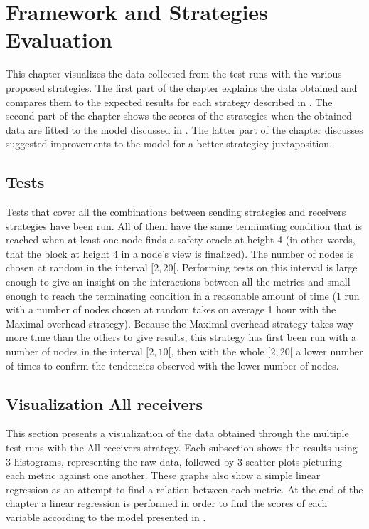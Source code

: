 \chapter{Framework and Strategies Evaluation}
\label{chap:strategies}

This chapter visualizes the data collected from the test runs with the various
proposed strategies. The first part of the chapter explains the data obtained
and compares them to the expected results for each strategy described in
. The second part of the chapter shows the scores of the
strategies when the obtained data are fitted to the model discussed in
. The latter part of the chapter discusses suggested
improvements to the model for a better strategiey juxtaposition.

\section{Tests}
Tests that cover all the combinations between sending strategies and receivers
strategies have been run.  All of them have the same terminating condition that
is reached when at least one node finds a safety oracle at height 4 (in other
words, that the block at height 4 in a node's view is finalized). The number of
nodes is chosen at random in the interval \([2, 20[\). Performing tests on this
interval is large enough to give an insight on the interactions between all the
metrics and small enough to reach the terminating condition in a reasonable
amount of time (1 run with a number of nodes chosen at random takes on average 1
hour with the Maximal overhead strategy). Because the Maximal overhead strategy
takes way more time than the others to give results, this strategy has first
been run with a number of nodes in the interval \([2,10[\), then with the whole
\([2, 20[\) a lower number of times to confirm the tendencies observed with the
lower number of nodes.

\section{Visualization All receivers}
This section presents a visualization of the data obtained through the multiple
test runs with the All receivers strategy.  Each subsection shows the results
using 3 histograms, representing the raw data, followed by 3 scatter plots
picturing each metric against one another. These graphs also show a simple linear
regression as an attempt to find a relation between each metric. At the end of
the chapter a linear regression is performed in order to
find the scores of each variable according to the model presented in
.


